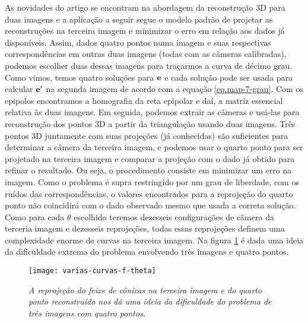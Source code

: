 As novidades do artigo se encontram na abordagem da reconstrução 3D para duas imagens e a aplicação a seguir segue o modelo padrão de projetar as reconstruções na terceira imagem e minimizar o erro em relação aos dados já disponíveis. Assim, dados quatro pontos numa imagem e suas respectivas correspondências em outras duas imagens (todas com as câmeras calibradas), podemos escolher duas dessas imagens para traçarmos a curva de décimo grau. Como vimos, temos quatro soluções para   ${\bf e}$ e cada solução pode ser usada para calcular ${\bf e'}$ na segunda imagem de acordo com a equação \ref{eq.map-7-grau}. Com os epipolos encontramos a homografia da reta epipolar  e daí, a matriz essencial relativa às duas imagens. Em seguida, podemos extrair as câmeras e usá-las para reconstrução dos pontos 3D a partir da triangulação usando duas imagens. Três pontos 3D juntamente com suas projeções (já conhecidas) são suficientes para determinar a câmera da terceira imagem, e podemos usar o quarto ponto para ser projetado na terceira imagem e comparar a projeção com o dado já obtido para refinar o resultado. Ou seja, o procedimento consiste em minimizar um erro na imagem. Como o problema é supra restringido por um grau de liberdade, com os ruídos das correspondências, o valores encontrados para a reprojeção do quarto ponto não coincidirá com o dado observado mesmo que usada a correta solução. Como para cada $\theta$ escolhido teremos dezesseis configurações de câmera da terceria imagem e dezesseis reprojeções, todas essas reprojeções definem uma complexidade enorme de curvas na terceira imagem. Na figura \ref{curvas-f(theta)} é dada uma ideia da dificuldade extrema do problema envolvendo três imagens e quatro pontos. 

\begin{figure}[!htb]
\centering
\texttt{[image: varias-curvas-f-theta]}
\caption{\textit{A reprojeção do feixe de cônicas na terceira imagem e do quarto ponto reconstruído nos dá uma ideia da dificuldade do problema de três imagens com quatro pontos.}}
\label{curvas-f(theta)}
\end{figure}
